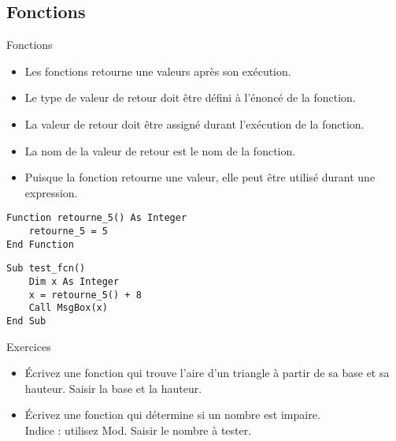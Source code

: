 \documentclass[aspectratio=169,usenames,dvipsnames]{beamer}
\begin{document}
    \subsection{Fonctions}
    \begin{frame}[fragile]{Fonctions}
        \begin{itemize}
            \item Les fonctions retourne une valeurs après son exécution.
            \item Le type de valeur de retour doit être défini à l’énoncé de la fonction.
            \item La valeur de retour doit être assigné durant l’exécution de la fonction.
            \item La nom de la valeur de retour est le nom de la fonction.
            \item Puisque la fonction retourne une valeur, elle peut être utilisé durant une expression.
        \end{itemize}
\noindent\begin{minipage}{.48\textwidth}
\begin{lstlisting}
Function retourne_5() As Integer
    retourne_5 = 5
End Function
\end{lstlisting}
\end{minipage}\hfill
\begin{minipage}{.48\textwidth}
\begin{lstlisting}
Sub test_fcn()
    Dim x As Integer
    x = retourne_5() + 8
    Call MsgBox(x)
End Sub
\end{lstlisting}
\end{minipage}\hfill
    \end{frame}
    \begin{frame}{Exercices}
        \begin{itemize}
            \item Écrivez une fonction qui trouve l’aire d’un triangle à partir de sa base et sa hauteur. Saisir la base et la hauteur.
            \item Écrivez une fonction qui détermine si un nombre est impaire. \\Indice : utilisez Mod. Saisir le nombre à tester.
        \end{itemize}
    \end{frame}
\end{document}

